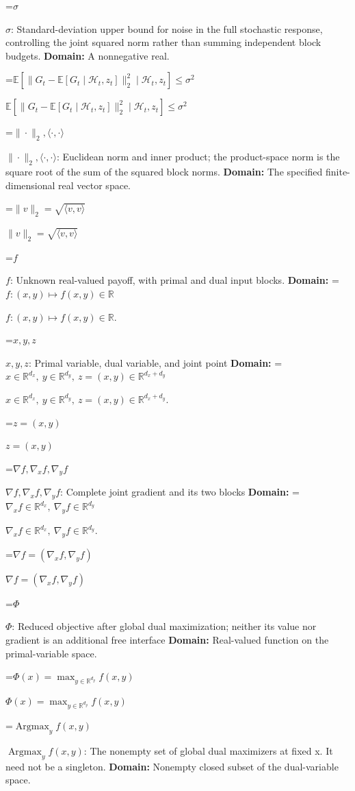 \documentclass[10pt,a4paper]{article}
\newcommand{\AtlasMath}[1]{\par\begingroup\centering\setbox0=\hbox{$\displaystyle #1$}\ifdim\wd0>1.4\linewidth\typeout{ATLAS WIDE FORMULA: \the\wd0}\fi\ifdim\wd0>\linewidth\resizebox{\linewidth}{!}{\box0}\else\box0\fi\par\endgroup}
\newcommand{\AtlasInlineMath}[1]{\begingroup\setbox0=\hbox{$#1$}\ifdim\wd0>.4\linewidth\endgroup\AtlasMath{#1}\else\endgroup$#1$\fi}
\begin{document}
\AtlasInlineMath{\sigma}: Standard-deviation upper bound for noise in the full stochastic response, controlling the joint squared norm rather than summing independent block budgets. \textbf{Domain:} A nonnegative real.



\AtlasInlineMath{\mathbb E[\|G_t-\mathbb E[G_t\mid\mathcal H_t,z_t]\|_2^2\mid\mathcal H_t,z_t]\le\sigma^2}



\AtlasInlineMath{\|\cdot\|_2,\langle\cdot,\cdot\rangle}: Euclidean norm and inner product; the product-space norm is the square root of the sum of the squared block norms. \textbf{Domain:} The specified finite-dimensional real vector space.



\AtlasInlineMath{\|v\|_2=\sqrt{\langle v,v\rangle}}



\AtlasInlineMath{f}: Unknown real-valued payoff, with primal and dual input blocks. \textbf{Domain:} \AtlasInlineMath{f:(x,y)\mapsto f(x,y)\in\mathbb R}.



\AtlasInlineMath{x,y,z}: Primal variable, dual variable, and joint point \textbf{Domain:} \AtlasInlineMath{x\in\mathbb R^{d_x},\ y\in\mathbb R^{d_y},\ z=(x,y)\in\mathbb R^{d_x+d_y}}.



\AtlasInlineMath{z=(x,y)}



\AtlasInlineMath{\nabla f,\nabla_x f,\nabla_y f}: Complete joint gradient and its two blocks \textbf{Domain:} \AtlasInlineMath{\nabla_x f\in\mathbb R^{d_x},\ \nabla_y f\in\mathbb R^{d_y}}.



\AtlasInlineMath{\nabla f=(\nabla_x f,\nabla_y f)}



\AtlasInlineMath{\Phi}: Reduced objective after global dual maximization; neither its value nor gradient is an additional free interface \textbf{Domain:} Real-valued function on the primal-variable space.



\AtlasInlineMath{\Phi(x)=\max_{y\in \mathbb R^{d_y}}f(x,y)}



\AtlasInlineMath{\operatorname{Argmax}_y f(x,y)}: The nonempty set of global dual maximizers at fixed x. It need not be a singleton. \textbf{Domain:} Nonempty closed subset of the dual-variable space.
\end{document}
